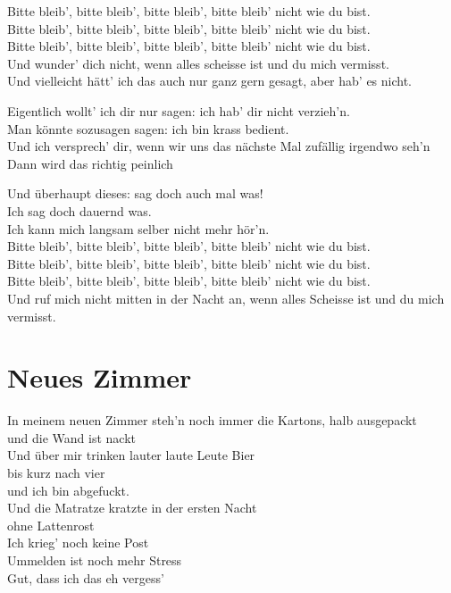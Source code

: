 \documentclass[]{book}
\begin{document}
Bitte bleib', bitte bleib', bitte bleib', bitte bleib' nicht wie du bist.\\
Bitte bleib', bitte bleib', bitte bleib', bitte bleib' nicht wie du bist.\\
Bitte bleib', bitte bleib', bitte bleib', bitte bleib' nicht wie du bist.\\
Und wunder' dich nicht, wenn alles scheisse ist und du mich vermisst.\\
Und vielleicht hätt' ich das auch nur ganz gern gesagt, aber hab' es nicht.

Eigentlich wollt' ich dir nur sagen: ich hab' dir nicht verzieh'n.\\
Man könnte sozusagen sagen: ich bin krass bedient.\\
Und ich versprech' dir, wenn wir uns das nächste Mal zufällig irgendwo seh'n\\
Dann wird das richtig peinlich

Und überhaupt dieses: sag doch auch mal was!\\
Ich sag doch dauernd was.\\
Ich kann mich langsam selber nicht mehr hör'n.\\
Bitte bleib', bitte bleib', bitte bleib', bitte bleib' nicht wie du bist.\\
Bitte bleib', bitte bleib', bitte bleib', bitte bleib' nicht wie du bist.\\
Bitte bleib', bitte bleib', bitte bleib', bitte bleib' nicht wie du bist.\\
Und ruf mich nicht mitten in der Nacht an, wenn alles Scheisse ist und du mich vermisst.

\hypertarget{neues-zimmer}{%
\section{Neues Zimmer}\label{neues-zimmer}}

In meinem neuen Zimmer steh'n noch immer die Kartons, halb ausgepackt\\
und die Wand ist nackt\\
Und über mir trinken lauter laute Leute Bier\\
bis kurz nach vier\\
und ich bin abgefuckt.\\
Und die Matratze kratzte in der ersten Nacht\\
ohne Lattenrost\\
Ich krieg' noch keine Post\\
Ummelden ist noch mehr Stress\\
Gut, dass ich das eh vergess'
\end{document}
